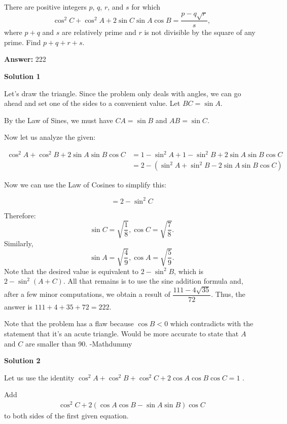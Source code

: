 \begin{enumerate}
There are positive integers $p$, $q$, $r$, and $s$ for which 
 \[\cos^2 C + \cos^2 A + 2 \sin C \sin A \cos B = \frac{p-q\sqrt{r}}{s},\] where $p+q$ and $s$ are relatively prime and $r$ is not divisible by the square of any prime.  Find $p+q+r+s$.


 
 \textbf{Answer: }222



\textbf{Solution 1}

Let's draw the triangle. Since the problem only deals with angles, we can go ahead and set one of the sides to a convenient value. Let $BC = \sin{A}$.

 By the Law of Sines, we must have $CA = \sin{B}$ and $AB = \sin{C}$.

 Now let us analyze the given:

 
 \begin{align*} \cos^2A + \cos^2B + 2\sin A\sin B\cos C &= 1-\sin^2A + 1-\sin^2B + 2\sin A\sin B\cos C \\ &= 2-(\sin^2A + \sin^2B - 2\sin A\sin B\cos C) \end{align*}


 Now we can use the Law of Cosines to simplify this:

 
 \[= 2-\sin^2C\]

 
Therefore: 
 \[\sin C = \sqrt{\dfrac{1}{8}},\cos C = \sqrt{\dfrac{7}{8}}.\] Similarly, 
 \[\sin A = \sqrt{\dfrac{4}{9}},\cos A = \sqrt{\dfrac{5}{9}}.\] Note that the desired value is equivalent to $2-\sin^2B$, which is $2-\sin^2(A+C)$. All that remains is to use the sine addition formula and, after a few minor computations, we obtain a result of $\dfrac{111-4\sqrt{35}}{72}$. Thus, the answer is $111+4+35+72 = \boxed{222}$.

 Note that the problem has a flaw because $\cos B < 0$ which contradicts with the statement that it's an acute triangle. Would be more accurate to state that $A$ and $C$ are smaller than 90. -Mathdummy

 



\textbf{Solution 2}

Let us use the identity $\cos^2A+\cos^2B+\cos^2C+2\cos A \cos B \cos C=1$ .

 Add 
 \begin{align*} \cos^2 C+2(\cos A\cos B-\sin A \sin B)\cos C \end{align*}
 to both sides of the first given equation. 

 



\end{enumerate}
